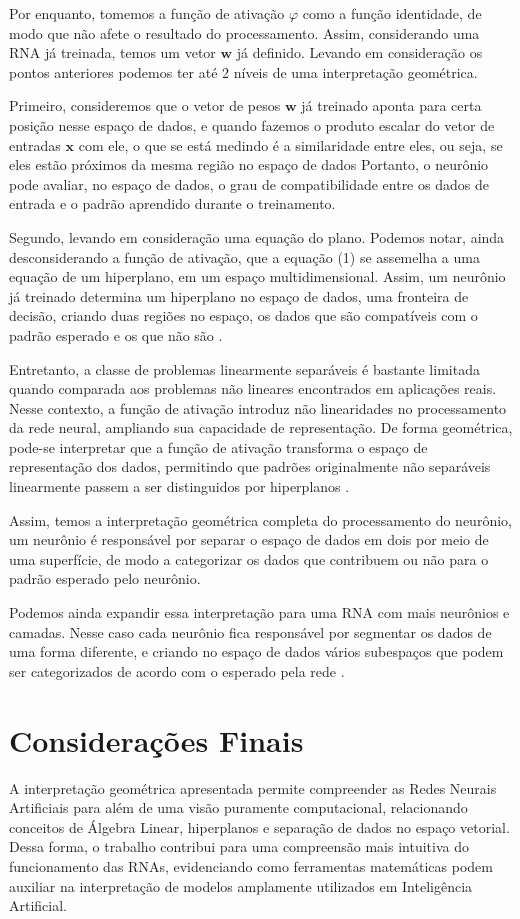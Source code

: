 \documentclass{ermacrs2025C}
\begin{document}
Por enquanto, tomemos a função de ativação $\varphi$ como a função
identidade, de modo que não afete o resultado do processamento.
Assim, considerando uma RNA já treinada, temos um vetor $\mathbf w$
já definido. Levando em consideração os pontos anteriores podemos ter
até 2 níveis de uma interpretação geométrica.

Primeiro, consideremos que o vetor de pesos $\mathbf w$ já treinado
aponta para certa posição nesse espaço de dados, e quando fazemos o
produto escalar do vetor de entradas $\mathbf x$ com ele, o que se
está medindo é a similaridade entre eles, ou seja, se eles estão
próximos da mesma região no espaço de dados Portanto, o neurônio pode
avaliar, no espaço de dados, o grau de compatibilidade entre os dados
de entrada e o padrão aprendido durante o treinamento.

Segundo, levando em consideração uma equação do plano. Podemos notar,
ainda desconsiderando a função de ativação, que a equação (1) se
assemelha a uma equação de um hiperplano, em um espaço
multidimensional. Assim, um neurônio já treinado determina um
hiperplano no espaço de dados, uma fronteira de decisão, criando duas
regiões no espaço, os dados que são compatíveis com o padrão esperado
e os que não são \cite[p. 163]{haykin2001}.

Entretanto, a classe de problemas linearmente separáveis é bastante
limitada quando comparada aos problemas não lineares encontrados em
aplicações reais. Nesse contexto, a função de ativação introduz não
linearidades no processamento da rede neural, ampliando sua
capacidade de representação. De forma geométrica, pode-se interpretar
que a função de ativação transforma o espaço de representação dos
dados, permitindo que padrões originalmente não separáveis
linearmente passem a ser distinguidos por hiperplanos \cite{olah2014}.

Assim, temos a interpretação geométrica completa do processamento do
neurônio, um neurônio é responsável por separar o espaço de dados em
dois por meio de uma superfície, de modo a categorizar os dados que
contribuem ou não para o padrão esperado pelo neurônio.

Podemos ainda expandir essa interpretação para uma RNA com mais
neurônios e camadas. Nesse caso cada neurônio fica responsável por
segmentar os dados de uma forma diferente, e criando no espaço de
dados vários subespaços que podem ser categorizados de acordo com o
esperado pela rede \cite[p. 29]{haykin2001}.

\section{Considerações Finais}
A interpretação geométrica apresentada permite compreender as Redes
Neurais Artificiais para além de uma visão puramente computacional,
relacionando conceitos de Álgebra Linear, hiperplanos e separação de
dados no espaço vetorial. Dessa forma, o trabalho contribui para uma
compreensão mais intuitiva do funcionamento das RNAs, evidenciando
como ferramentas matemáticas podem auxiliar na interpretação de
modelos amplamente utilizados em Inteligência Artificial.

\printreferences
\end{document}

